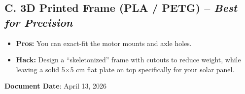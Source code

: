 \documentclass[12pt,a4paper]{article}
\begin{document}
\subsection{C. 3D Printed Frame (PLA / PETG) -- \textit{Best for Precision}}
\begin{itemize}
    \item \textbf{Pros:} You can exact-fit the motor mounts and axle holes.
    \item \textbf{Hack:} Design a ``skeletonized'' frame with cutouts to reduce weight, while leaving a solid 5$\times$5 cm flat plate on top specifically for your solar panel.
\end{itemize}

\vspace{1cm}
\noindent\textbf{Document Date}: April 13, 2026
\end{document}
